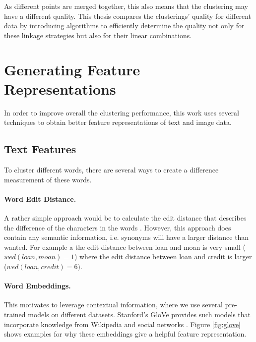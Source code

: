 As different points are merged together, this also means that the clustering may have a different quality. This thesis compares the clusterings' quality for different data by introducing algorithms to efficiently determine the quality not only for these linkage strategies but also for their linear combinations.

\section{Generating Feature Representations}

In order to improve overall the clustering performance, this work uses several techniques to obtain better feature representations of text and image data. 

\subsection{Text Features}

To cluster different words, there are several ways to create a difference measurement of these words. 

\paragraph{Word Edit Distance.} A rather simple approach would be to calculate the edit distance that describes the difference of the characters in the words \cite{ristad1998learning}. However, this approach does contain any semantic information, i.e. synonyms will have a larger distance than wanted. For example a the edit distance between loan and moan is very small ($wed(loan, moan) =  1$) where the edit distance between loan and credit is larger ($wed(loan, credit) = 6)$.\\ 

\paragraph{Word Embeddings.} This motivates to leverage contextual information, where we use several pre-trained models on different datasets. Stanford's GloVe provides such models that incorporate knowledge from Wikipedia and social networks \cite{pennington2014glove}. Figure \ref{fig:glove} shows examples for why these embeddings give a helpful feature representation.\\

